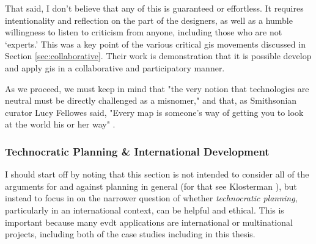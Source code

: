 That said, I don't believe that any of this is guaranteed or effortless. It requires intentionality and reflection on the part of the designers, as well as a humble willingness to listen to criticism from anyone, including those who are not `experts.' This was a key point of the various critical \ac{gis} movements discussed in Section \ref{sec:collaborative}. Their work is demonstration that it is possible develop and apply \ac{gis} in a collaborative and participatory manner.

As we proceed, we must keep in mind that "the very notion that technologies are neutral must be directly challenged as a misnomer," \cite{nobleAlgorithmsOppressionHow2018} and that, as Smithsonian curator Lucy Fellowes said, "Every map is someone's way of getting you to look at the world his or her way" \cite{henriksonPowerPoliticsMaps1994}. 







\subsubsection{Technocratic Planning \& International Development} \label{sec:technocracy}

I should start off by noting that this section is not intended to consider all of the arguments for and against planning in general (for that see Klosterman \cite{klostermanArgumentsPlanning1985}), but instead to focus in on the narrower question of whether \textit{technocratic planning}, particularly in an international context, can be helpful and ethical. This is important because many \ac{evdt} applications are international or multinational projects, including both of the case studies including in this thesis.

